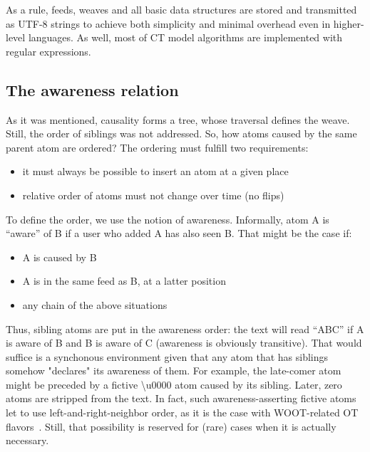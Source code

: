 \documentclass{acm_proc_article-sp}
\begin{document}
   As a rule, feeds, weaves and all basic data structures are stored
   and transmitted as UTF-8 strings to achieve both simplicity and
   minimal overhead even in higher-level languages. As well, most of
   CT model algorithms are implemented with regular expressions.

\subsection {The awareness relation}

   As it was mentioned, causality forms a tree, whose traversal
   defines the weave. Still, the order of siblings was not addressed.
   So, how atoms caused by the same parent atom are ordered? The
   ordering must fulfill two requirements:
   \begin{itemize}
     \item it must always be possible to insert an atom at a given place
     \item relative order of atoms must not change over time (no flips)
   \end{itemize}
   To define the order, we use the notion of awareness. 
   Informally, atom A is ``aware'' of B if a user who added A has
   also seen B. That might be the case if:
   \begin{itemize}
     \item A is caused by B
     \item A is in the same feed as B, at a latter position
     \item any chain of the above situations
   \end{itemize}
   Thus,
   sibling atoms are put in the awareness order: the text will read
   ``ABC'' if A is aware of
   B and B is aware of C (awareness is obviously transitive). 
   That would suffice
   is a synchonous environment given that any atom that has siblings
   somehow "declares" its awareness of them. For example,
   the late-comer atom might be preceded by a fictive
   {\textbackslash}u0000 atom caused by its sibling.
   Later, zero atoms are stripped from the text.
   In fact, such awareness-asserting fictive atoms let to use
   left-and-right-neighbor order, as it is the case with WOOT-related
   OT flavors~\cite{woot}. Still, that possibility is reserved for
   (rare) cases when it is actually necessary.
   
\end{document}
